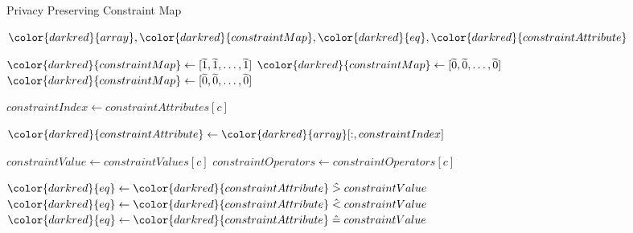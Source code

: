 \begin{algorithm}[H]
\caption{Privacy Preserving Constraint Map}\label{a:filters}
\begin{algorithmic}[1]
\renewcommand{\algorithmicrequire}{\textbf{Private Vars:}}
\Require ${\color{darkred}{array}}, {\color{darkred}{constraintMap}}, {\color{darkred}{eq}}, {\color{darkred}{constraintAttribute}}$


        \State ${\color{darkred}{constraintMap}} \gets [\enc{1}, \enc{1}, \dots, \enc{1}]$ 
        \State ${\color{darkred}{constraintMap}} \gets [\enc{0}, \enc{0}, \dots, \enc{0}]$ 
        \State ${\color{darkred}{constraintMap}} \gets [\enc{0}, \enc{0}, \dots, \enc{0}]$ 
    \EndIf


        \State $constraintIndex \gets constraintAttributes[c]$

        \State ${\color{darkred}{constraintAttribute}} \gets {\color{darkred}{array}}[:, constraintIndex]$

        \State $constraintValue \gets constraintValues[c]$
        \State $constraintOperators \gets constraintOperators[c]$

            \State ${\color{darkred}{eq}} \gets {\color{darkred}{constraintAttribute}} \hgt constraintValue$ 
            \State ${\color{darkred}{eq}} \gets {\color{darkred}{constraintAttribute}} \hlt constraintValue$
            \State ${\color{darkred}{eq}} \gets {\color{darkred}{constraintAttribute}} \heq constraintValue$
        \EndIf


\end{algorithmic}
\end{algorithm}
